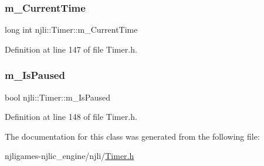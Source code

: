\subsubsection{\texorpdfstring{m\+\_\+\+Current\+Time}{m\_CurrentTime}}
{\footnotesize\ttfamily long int njli\+::\+Timer\+::m\+\_\+\+Current\+Time\hspace{0.3cm}{\ttfamily [private]}}



Definition at line 147 of file Timer.\+h.

\mbox{\label{classnjli_1_1_timer_a41a4f6b6f65df4beef065232a19b45d7}} 
\subsubsection{\texorpdfstring{m\+\_\+\+Is\+Paused}{m\_IsPaused}}
{\footnotesize\ttfamily bool njli\+::\+Timer\+::m\+\_\+\+Is\+Paused\hspace{0.3cm}{\ttfamily [private]}}



Definition at line 148 of file Timer.\+h.



The documentation for this class was generated from the following file\+:\begin{DoxyCompactItemize}
\item 
njligames-\/njlic\+\_\+engine/njli/\mbox{\hyperlink{_timer_8h}{Timer.\+h}}\end{DoxyCompactItemize}
